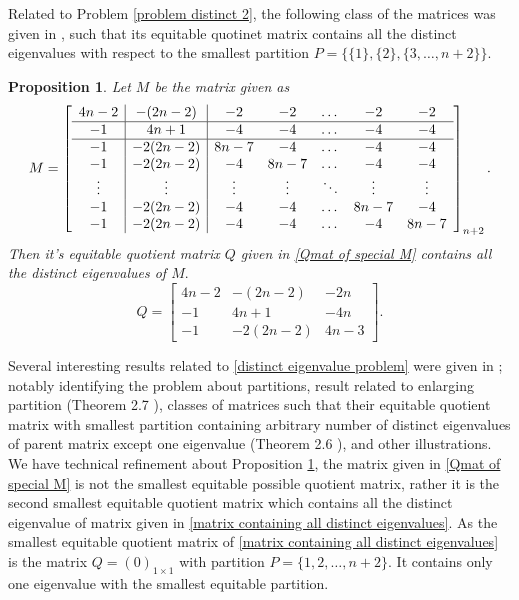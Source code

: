 \documentclass[12pt,twoside]{article}
\newtheorem{proposition}[theorem]{Proposition}
\begin{document}
Related to Problem \ref{problem distinct 2}, the following class of the matrices was given in \cite{bilalijpam}, such that its equitable quotinet matrix contains all the distinct eigenvalues with respect to the smallest partition $P=\{\{1\},\{2\},\{3,\dots,n+2\}\}.$
\begin{proposition}\label{Qmat contains distinct eigenvalues of M}
	Let $ M $ be the matrix given as
	\begin{equation}\label{matrix containing all distinct eigenvalues}
		M=\left[ \begin{array}{c | c | c c c c c}
			4n-2 & -(2n-2) & -2   & -2 & \dots   & -2 & -2\\
			\hline
			-1   & 4n+1   & -4   & -4 & \dots   & -4 & -4\\
			\hline
			-1   & -2(2n-2) & 8n-7 & -4 & \dots   & -4 & -4\\
			-1   & -2(2n-2) & -4 & 8n-7 & \dots   & -4 & -4\\
			\vdots & \vdots & \vdots & \vdots & \ddots & \vdots & \vdots\\
			-1   & -2(2n-2) & -4 & -4 & \dots   & 8n-7 & -4\\
			-1   & -2(2n-2) & -4 & -4 & \dots   & -4 & 8n-7
		\end{array}
		\right ]_{n+2}. 
	\end{equation}
	 Then it's equitable quotient matrix $ Q $ given in \eqref{Qmat of special M} contains all the distinct eigenvalues of $ M. $
	\begin{equation}\label{Qmat of special M}
		Q=\begin{bmatrix}
			4n-2 & -(2n-2) & -2n\\
			-1   & 4n+1    & -4n\\
			-1   & -2(2n-2)& 4n-3
		\end{bmatrix}.
	\end{equation}
\end{proposition}
Several interesting results related to \ref{distinct eigenvalue problem} were given in \cite{bilalijpam}; notably identifying the problem about partitions, result related to enlarging partition (Theorem 2.7 \cite{bilalijpam}), classes of matrices such that their equitable quotient matrix with smallest partition containing arbitrary number of distinct eigenvalues of parent matrix except one eigenvalue (Theorem 2.6 \cite{bilalijpam}), and other illustrations. We have technical refinement about Proposition \ref{Qmat contains distinct eigenvalues of M}, the matrix given in \eqref{Qmat of special M} is not the smallest equitable possible quotient matrix, rather it is the second smallest equitable quotient matrix which contains all the distinct eigenvalue of matrix given in \eqref{matrix containing all distinct eigenvalues}. As the smallest equitable quotient matrix of \eqref{matrix containing all distinct eigenvalues} is the matrix $Q=(0)_{1\times 1}$ with partition $P=\{1,2,\dots,n+2\}$. It contains only one eigenvalue with the smallest equitable partition. \vskip 2mm
\end{document}
